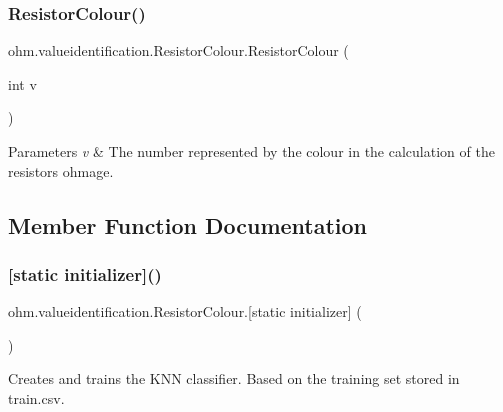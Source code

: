 \subsubsection{\texorpdfstring{Resistor\+Colour()}{ResistorColour()}}
{\footnotesize\ttfamily ohm.\+valueidentification.\+Resistor\+Colour.\+Resistor\+Colour (\begin{DoxyParamCaption}\item[{int}]{v }\end{DoxyParamCaption})}


\begin{DoxyItemize}
\item 
\begin{DoxyParams}{Parameters}
{\em v} & The number represented by the colour in the calculation of the resistor\textquotesingle{}s ohmage. \\
\hline
\end{DoxyParams}

\end{DoxyItemize}

\subsection{Member Function Documentation}
\hypertarget{enumohm_1_1valueidentification_1_1_resistor_colour_ada1c80467eac208be473beadf83f968f}{}\label{enumohm_1_1valueidentification_1_1_resistor_colour_ada1c80467eac208be473beadf83f968f} 
\subsubsection{\texorpdfstring{[static initializer]()}{[static initializer]()}}
{\footnotesize\ttfamily ohm.\+valueidentification.\+Resistor\+Colour.\mbox{[}static initializer\mbox{]} (\begin{DoxyParamCaption}{ }\end{DoxyParamCaption})\hspace{0.3cm}{\ttfamily [static]}}

Creates and trains the K\+NN classifier. Based on the training set stored in train.\+csv. \hypertarget{enumohm_1_1valueidentification_1_1_resistor_colour_a054bf549f7693e59f813f83d7b93148b}{}\label{enumohm_1_1valueidentification_1_1_resistor_colour_a054bf549f7693e59f813f83d7b93148b} 
